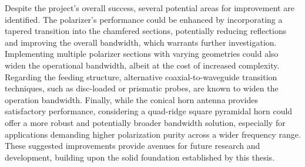 \documentclass[14pt,a4paper]{ntust_report}
\begin{document}
Despite the project's overall success, several potential areas for improvement are identified. The polarizer's performance could be enhanced by incorporating a tapered transition into the chamfered sections, potentially reducing reflections and improving the overall bandwidth, which warrants further investigation. Implementing multiple polarizer sections with varying geometries could also widen the operational bandwidth, albeit at the cost of increased complexity. Regarding the feeding structure, alternative coaxial-to-waveguide transition techniques, such as disc-loaded or prismatic probes, are known to widen the operation bandwidth. Finally, while the conical horn antenna provides satisfactory performance, considering a quad-ridge square pyramidal horn could offer a more robust and potentially broader bandwidth solution, especially for applications demanding higher polarization purity across a wider frequency range. These suggested improvements provide avenues for future research and development, building upon the solid foundation established by this thesis.

\printbibliography[heading=bibintoc,title={References}]
\end{document}
